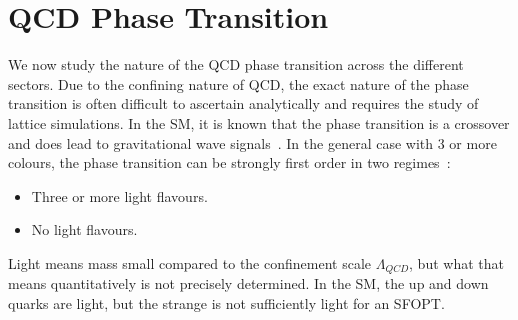 \documentclass[nofootinbib,twocolumn,preprintnumbers]{revtex4-1}
\begin{document}
\section{QCD Phase Transition}
\label{sec:dQCD}
%
We now study the nature of the QCD phase transition across the different sectors. Due to the confining nature of QCD, the exact nature of the phase transition is often difficult to ascertain analytically and requires the study of lattice simulations. In the SM, it is known that the phase transition is a crossover and does lead to gravitational wave signals~\cite{Aoki:2006we,Bhattacharya:2014ara}. In the general case with 3 or more colours, the phase transition can be strongly first order in two regimes~\cite{SVETITSKY1982423,Pisarski:1983ms,Panero:2009tv}:
\begin{itemize}
\item Three or more light flavours.
\item No light flavours. 
\end{itemize}
Light means mass small compared to the confinement scale $\Lambda_{QCD}$, but what that means quantitatively is not precisely determined. In the SM, the up and down quarks are light, but the strange is not sufficiently light for an SFOPT.
%
\end{document}
